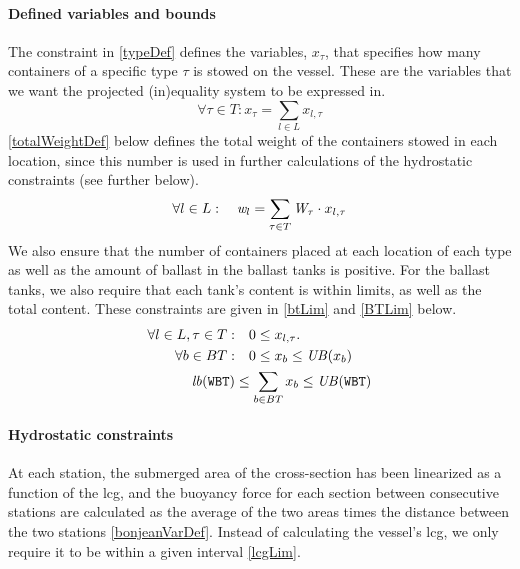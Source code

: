 \paragraph{Defined variables and bounds}
The constraint in \eqref{typeDef} defines the variables, $x_\tau$, that specifies how many containers of a specific type $\tau$ is stowed on the vessel. These are the variables that we want the projected (in)equality system to be expressed in.
\begin{equation}
\label{typeDef}%
	\forall{\tau \in T}: x_\tau = \sum_{l\in L} x_{l,\tau}
\end{equation}
\eqref{totalWeightDef} below defines the total weight of the containers stowed in each location, since this number is used in further calculations of the hydrostatic constraints (see further below). 
\begin{equation}
\label{totalWeightDef}
	\forall l \in L:\quad \mathit{w}_l = \sum_{\tau \in T} \mathit{W}_\tau\cdot x_{l,\tau}\\
\end{equation}
We also ensure that the number of containers placed at each location of each type as well as the amount of ballast in the ballast tanks is positive. 
For the ballast tanks, we also require that each tank's content is within limits, as well as the total content. These constraints are given in \eqref{btLim} and \eqref{BTLim} below.
\begin{align}
\label{xPos}
	\forall l\in L, \tau\in T:&\quad 0\leq x_{l,\tau}.\\
\label{btLim}
	\forall b \in BT:	&\quad 0 \leq x_b \leq \mi{UB}(x_b)\\ 
%
\label{BTLim}
	\mi{lb}(\trt{WBT}) &\leq \sum_{b \in BT} x_b	\leq \mi{UB}(\trt{WBT})
\end{align}
%
\paragraph{Hydrostatic constraints}
At each station, the submerged area of the cross-section has been linearized as a function of the lcg, and the buoyancy force for each section between consecutive stations are calculated as the average of the two areas times the distance between the two stations \eqref{bonjeanVarDef}. 
Instead of calculating the vessel's lcg, we only require it to be within a given interval \eqref{lcgLim}.


